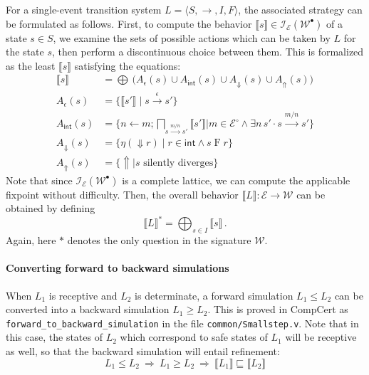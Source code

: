 \documentclass[sigplan,10pt,review,anonymous]{acmart}
\newcommand{\kw}[1]{\ensuremath{\mathsf{#1}}}
\newcommand{\bdot}{\cdot}
\newcommand{\que}{{\circ}}
\newcommand{\ans}{{\bullet}}
\begin{document}
For a single-event transition system
$L = \langle S, {\rightarrow}, I, F \rangle$,
the associated strategy
can be formulated as follows.
First,
to compute the behavior
$\llbracket s \rrbracket \in \mathcal{I}_\mathcal{E}(\mathcal{W}^\ans)$
of a state $s \in S$,
we examine the sets of possible actions
which can be taken by $L$
for the state $s$,
then perform a discontinuous choice between them.
This is formalized as the least $\llbracket s \rrbracket$
satisfying the equations:
\begin{align*}
  \llbracket s \rrbracket &=
    \bigoplus \:
    \big(
      A_\epsilon(s) \cup A_\kw{int}(s) \cup
      A_\Downarrow(s) \cup A_\Uparrow(s)
    \big)
  \\
  A_\epsilon(s) &=
    \{ \llbracket s' \rrbracket \mid s \stackrel{\epsilon}{\rightarrow} s' \}
  \\
  A_\kw{int}(s) &=
    \Big\{
      n \mathbin\leftarrow m \mathbin;
      \bigsqcap_{s \stackrel{m/n}{\longrightarrow} s'}
	\llbracket s' \rrbracket
    \mathrel{\Big\vert}
      m \in \mathcal{E}^\que \wedge
      \exists n \, s' \bdot s \stackrel{m/n}{\longrightarrow} s'
    \Big\}
  \\
  A_\Downarrow(s) &=
    \{ \eta({\Downarrow} r) \mid r \in \kw{int} \wedge s \mathrel{F} r \}
  \\
  A_\Uparrow(s) &=
    \{ {\Uparrow} \mid s \text{ silently diverges} \}
\end{align*}
Note that since $\mathcal{I}_\mathcal{E}(\mathcal{W}^\ans)$
is a complete lattice,
we can compute the applicable fixpoint without difficulty.
Then,
the overall behavior
$\llbracket L \rrbracket : \mathcal{E} \rightarrow \mathcal{W}$
can be obtained by defining
\[
  \llbracket L \rrbracket^* = \bigoplus_{s \in I} \llbracket s \rrbracket
  \,.
\]
Again, here $*$ denotes the only question in the signature $\mathcal{W}$.

\paragraph{Converting forward to backward simulations}

When $L_1$ is receptive and $L_2$ is determinate,
a forward simulation $L_1 \le L_2$ can be converted
into a backward simulation $L_1 \ge L_2$.
This is proved in CompCert
as \texttt{forward\_to\_backward\_simulation}
in the file \texttt{common/Smallstep.v}.
Note that in this case,
the states of $L_2$ which correspond
to safe states of $L_1$ will be receptive as well,
so that the backward simulation will entail refinement:
\[
  L_1 \le L_2 \: \Rightarrow \:
  L_1 \ge L_2 \: \Rightarrow \:
  \llbracket L_1 \rrbracket \sqsubseteq \llbracket L_2 \rrbracket
\]
\end{document}

